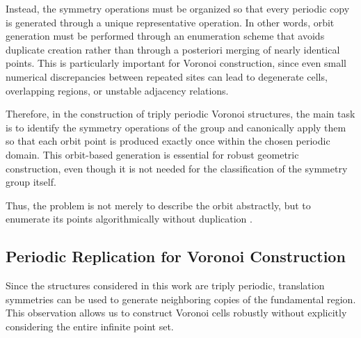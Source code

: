 \documentclass[times,twocolumn,final]{elsarticle}
\newcommand{\ergun}[1]{{\color{red} #1}}
\begin{document}
Instead, the symmetry operations must be organized so that every periodic copy is generated through a unique representative operation. In other words, orbit generation must be performed through an enumeration scheme that avoids duplicate creation rather than through a posteriori merging of nearly identical points. This is particularly important for Voronoi construction, since even small numerical discrepancies between repeated sites can lead to degenerate cells, overlapping regions, or unstable adjacency relations.


Therefore, in the construction of triply periodic Voronoi structures, the main task is to identify the symmetry operations of the group and canonically apply them so that each orbit point is produced exactly once within the chosen periodic domain. This orbit-based generation is essential for robust geometric construction, even though it is not needed for the classification of the symmetry group itself.

Thus, the problem is not merely to describe the orbit abstractly, but to enumerate its points algorithmically without duplication \cite{ebert2024handlebody}.

\subsection{Periodic Replication for Voronoi Construction}

Since the structures considered in this work are triply periodic, translation symmetries can be used to generate neighboring copies of the fundamental region. This observation allows us to construct Voronoi cells robustly without explicitly considering the entire infinite point set.
\end{document}
